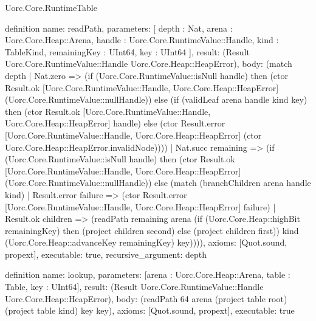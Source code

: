 \begin{lexlean}{Uorc.Core.RuntimeTable}
\begin{semanticmodule}
definition{
  name: readPath,
  parameters: [
    depth : Nat,
    arena : Uorc.Core.Heap::Arena,
    handle : Uorc.Core.RuntimeValue::Handle,
    kind : TableKind,
    remainingKey : UInt64,
    key : UInt64
  ],
  result: (Result Uorc.Core.RuntimeValue::Handle Uorc.Core.Heap::HeapError),
  body: (match depth
    | Nat.zero => (if (Uorc.Core.RuntimeValue::isNull handle) then (ctor Result.ok [Uorc.Core.RuntimeValue::Handle, Uorc.Core.Heap::HeapError] (Uorc.Core.RuntimeValue::nullHandle)) else (if (validLeaf arena handle kind key) then (ctor Result.ok [Uorc.Core.RuntimeValue::Handle, Uorc.Core.Heap::HeapError] handle) else (ctor Result.error [Uorc.Core.RuntimeValue::Handle, Uorc.Core.Heap::HeapError] (ctor Uorc.Core.Heap::HeapError.invalidNode))))
    | Nat.succ remaining => (if (Uorc.Core.RuntimeValue::isNull handle) then (ctor Result.ok [Uorc.Core.RuntimeValue::Handle, Uorc.Core.Heap::HeapError] (Uorc.Core.RuntimeValue::nullHandle)) else (match (branchChildren arena handle kind)
      | Result.error failure => (ctor Result.error [Uorc.Core.RuntimeValue::Handle, Uorc.Core.Heap::HeapError] failure)
      | Result.ok children => (readPath remaining arena (if (Uorc.Core.Heap::highBit remainingKey) then (project children second) else (project children first)) kind (Uorc.Core.Heap::advanceKey remainingKey) key)))),
  axioms: [Quot.sound, propext],
  executable: true,
  recursive_argument: depth
}

definition{
  name: lookup,
  parameters: [arena : Uorc.Core.Heap::Arena, table : Table, key : UInt64],
  result: (Result Uorc.Core.RuntimeValue::Handle Uorc.Core.Heap::HeapError),
  body: (readPath 64 arena (project table root) (project table kind) key key),
  axioms: [Quot.sound, propext],
  executable: true
}


\end{semanticmodule}
\end{lexlean}
